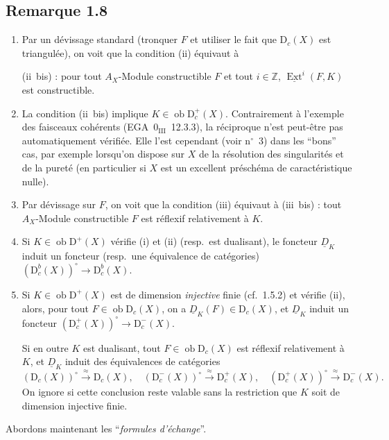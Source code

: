\documentclass[11pt]{article}
\DeclareMathOperator{\Ext}{Ext}
\newcommand{\D}{\mathrm{D}}
\newcommand{\Z}{\mathbb{Z}}
\newcommand{\ob}{\operatorname{ob}}
\providecommand{\ob}{\operatorname{ob}}
\begin{document}
\subsection*{Remarque 1.8}
\begin{enumerate}[label=\alph*)]
\item Par un dévissage standard (tronquer $F$ et utiliser le fait que $\D_c(X)$ est triangulée), on voit que la condition (ii) équivaut à

(ii~bis) : pour tout $A_X$-Module constructible $F$ et tout $i \in \Z$, $\underline{\Ext}^i(F,K)$ est constructible.

\item La condition (ii~bis) implique $K \in \ob \D_c^{+}(X)$. Contrairement à l'exemple des faisceaux cohérents (EGA~$0_{\mathrm{III}}$~12.3.3), la réciproque n'est peut-être pas automatiquement vérifiée. Elle l'est cependant (voir n${}^{\circ}$~3) dans les ``bons'' cas, par exemple lorsqu'on dispose sur $X$ de la résolution des singularités et de la pureté (en particulier si $X$ est un excellent préschéma de caractéristique nulle).

\item Par dévissage sur $F$, on voit que la condition (iii) équivaut à (iii~bis) : tout $A_X$-Module constructible $F$ est réflexif relativement à $K$.

\item Si $K \in \ob \D^{+}(X)$ vérifie (i) et (ii) (resp.~est dualisant), le foncteur $\underline{D}_K$ induit un foncteur (resp.~une équivalence de catégories) $(\D_c^{b}(X))^{\circ} \to \D_c^{b}(X)$.

\item Si $K \in \ob \D^{+}(X)$ est de dimension \emph{injective} finie (cf.~1.5.2) et vérifie (ii), alors, pour tout $F \in \ob \D_c(X)$, on a $\underline{D}_K(F) \in \D_c(X)$, et $\underline{D}_K$ induit un foncteur $(\D_c^{+}(X))^{\circ} \to \D_c^{-}(X)$.

Si en outre $K$ est dualisant, tout $F \in \ob \D_c(X)$ est réflexif relativement à $K$, et $\underline{D}_K$ induit des équivalences de catégories
\[
(\D_c(X))^{\circ} \xrightarrow{\approx} \D_c(X), \quad (\D_c^{-}(X))^{\circ} \xrightarrow{\approx} \D_c^{+}(X), \quad (\D_c^{+}(X))^{\circ} \xrightarrow{\approx} \D_c^{-}(X).
\]
On ignore si cette conclusion reste valable sans la restriction que $K$ soit de dimension injective finie.
\end{enumerate}

Abordons maintenant les ``\emph{formules d'échange}''.
\end{document}
